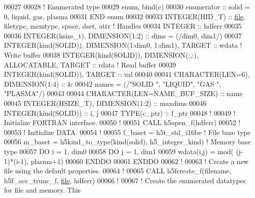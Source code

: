\begin{DoxyCode}
00027 
00028 \textcolor{comment}{! Enumerated type}
00029   enum, bind(c)
00030      enumerator :: solid = 0, liquid, gas, plasma
00031 \textcolor{keyword}{  END }enum
00032 
00033   \textcolor{keywordtype}{INTEGER(HID\_T)} :: \hyperlink{structfile}{file}, filetype, memtype, space, dset, attr \textcolor{comment}{! Handles}
00034   \textcolor{keywordtype}{INTEGER} :: hdferr
00035 
00036   \textcolor{keywordtype}{INTEGER(hsize\_t)},   \textcolor{keywordtype}{DIMENSION(1:2)} :: dims = (/dim0, dim1/)
00037   \textcolor{keywordtype}{INTEGER(kind(SOLID))}, \textcolor{keywordtype}{DIMENSION(1:dim0, 1:dim1)}, \textcolor{keywordtype}{TARGET} :: wdata \textcolor{comment}{! Write buffer}
00038   \textcolor{keywordtype}{INTEGER(kind(SOLID))}, \textcolor{keywordtype}{DIMENSION(:,:)}, \textcolor{keywordtype}{ALLOCATABLE}, \textcolor{keywordtype}{TARGET} :: rdata \textcolor{comment}{! Read buffer}
00039   \textcolor{keywordtype}{INTEGER(kind(SOLID))}, \textcolor{keywordtype}{TARGET} :: val
00040 
00041   \textcolor{keywordtype}{CHARACTER(LEN=6)}, \textcolor{keywordtype}{DIMENSION(1:4)} :: &
00042        names = (/\textcolor{stringliteral}{"SOLID "}, \textcolor{stringliteral}{"LIQUID"}, \textcolor{stringliteral}{"GAS   "}, \textcolor{stringliteral}{"PLASMA"}/)
00043 
00044   \textcolor{keywordtype}{CHARACTER(LEN=NAME\_BUF\_SIZE)} :: name
00045   \textcolor{keywordtype}{INTEGER(HSIZE\_T)}, \textcolor{keywordtype}{DIMENSION(1:2)} :: maxdims
00046   \textcolor{keywordtype}{INTEGER(kind(SOLID))} :: i, j
00047   \textcolor{keywordtype}{TYPE}(c\_ptr) :: f\_ptr
00048   \textcolor{comment}{!}
00049   \textcolor{comment}{! Initialize FORTRAN interface.}
00050   \textcolor{comment}{!}
00051   \textcolor{keyword}{CALL }h5open\_f(hdferr)
00052   \textcolor{comment}{!}
00053   \textcolor{comment}{! Initialize DATA.}
00054   \textcolor{comment}{!}
00055   f\_baset   = h5t\_std\_i16be      \textcolor{comment}{! File base type}
00056   m\_baset   = h5kind\_to\_type(kind(solid), h5\_integer\_kind) \textcolor{comment}{! Memory base type}
00057   \textcolor{keywordflow}{DO} i = 1, dim0
00058      \textcolor{keywordflow}{DO} j = 1, dim1 
00059         wdata(i,j) = mod( (j-1)*(i-1), plasma+1)
00060 \textcolor{keywordflow}{     ENDDO}
00061 \textcolor{keywordflow}{  ENDDO}
00062   \textcolor{comment}{!}
00063   \textcolor{comment}{! Create a new file using the default properties.}
00064   \textcolor{comment}{!}
00065   \textcolor{keyword}{CALL }h5fcreate\_f(filename, h5f\_acc\_trunc\_f, \hyperlink{structfile}{file}, hdferr)
00066   \textcolor{comment}{!}
00067   \textcolor{comment}{! Create the enumerated datatypes for file and memory.  This}

\end{DoxyCode}
